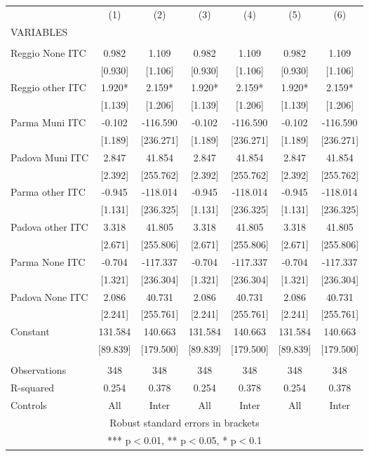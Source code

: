 \begin{tabular}{lcccccc} \hline
 & (1) & (2) & (3) & (4) & (5) & (6) \\
VARIABLES &  &  &  &  &  &  \\ \hline
 &  &  &  &  &  &  \\
Reggio None ITC & 0.982 & 1.109 & 0.982 & 1.109 & 0.982 & 1.109 \\
 & [0.930] & [1.106] & [0.930] & [1.106] & [0.930] & [1.106] \\
Reggio other ITC & 1.920* & 2.159* & 1.920* & 2.159* & 1.920* & 2.159* \\
 & [1.139] & [1.206] & [1.139] & [1.206] & [1.139] & [1.206] \\
Parma Muni ITC & -0.102 & -116.590 & -0.102 & -116.590 & -0.102 & -116.590 \\
 & [1.189] & [236.271] & [1.189] & [236.271] & [1.189] & [236.271] \\
Padova Muni ITC & 2.847 & 41.854 & 2.847 & 41.854 & 2.847 & 41.854 \\
 & [2.392] & [255.762] & [2.392] & [255.762] & [2.392] & [255.762] \\
Parma other ITC & -0.945 & -118.014 & -0.945 & -118.014 & -0.945 & -118.014 \\
 & [1.131] & [236.325] & [1.131] & [236.325] & [1.131] & [236.325] \\
Padova other ITC & 3.318 & 41.805 & 3.318 & 41.805 & 3.318 & 41.805 \\
 & [2.671] & [255.806] & [2.671] & [255.806] & [2.671] & [255.806] \\
Parma None ITC & -0.704 & -117.337 & -0.704 & -117.337 & -0.704 & -117.337 \\
 & [1.321] & [236.304] & [1.321] & [236.304] & [1.321] & [236.304] \\
Padova None ITC & 2.086 & 40.731 & 2.086 & 40.731 & 2.086 & 40.731 \\
 & [2.241] & [255.761] & [2.241] & [255.761] & [2.241] & [255.761] \\
Constant & 131.584 & 140.663 & 131.584 & 140.663 & 131.584 & 140.663 \\
 & [89.839] & [179.500] & [89.839] & [179.500] & [89.839] & [179.500] \\
 &  &  &  &  &  &  \\
Observations & 348 & 348 & 348 & 348 & 348 & 348 \\
R-squared & 0.254 & 0.378 & 0.254 & 0.378 & 0.254 & 0.378 \\
 Controls & All & Inter & All & Inter & All & Inter \\ \hline
\multicolumn{7}{c}{ Robust standard errors in brackets} \\
\multicolumn{7}{c}{ *** p$<$0.01, ** p$<$0.05, * p$<$0.1} \\
\end{tabular}
